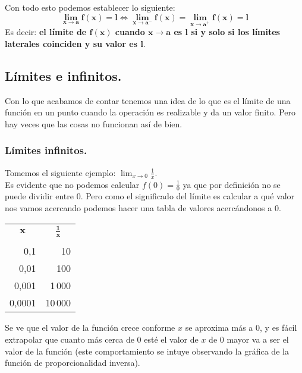 \documentclass[a4paper,11pt,answers]{exam}
\begin{document}
Con todo esto podemos establecer lo siguiente:
\[\boldsymbol{\lim_{x \to a} f(x) = l \Leftrightarrow \lim_{x \to a^-} f(x) = \lim_{x \to a^+} f(x) = l}\]
Es decir: \textbf{el límite de $\boldsymbol{f(x)}$ cuando $\boldsymbol{x \to a}$ es $\boldsymbol{l}$ si y solo si los límites laterales coinciden y su valor es $\boldsymbol{l}$}.

\subsection{Límites e infinitos.}
Con lo que acabamos de contar tenemos una idea de lo que es el límite de una función en un punto cuando la operación es realizable y da un valor finito. Pero hay veces que las cosas no funcionan así de bien.\\

\subsubsection{Límites infinitos.}
Tomemos el siguiente ejemplo: $\lim_{x \to 0} \frac{1}{x}$.\\
Es evidente que no podemos calcular $f(0) = \frac{1}{0}$ ya que por definición no se puede dividir entre 0. Pero como el significado del límite es calcular a qué valor nos vamos acercando podemos hacer una tabla de valores acercándonos a 0.
\begin{center}
\begin{tabular}{r|r}
\multicolumn{1}{c|}{$\boldsymbol{x}$} & \multicolumn{1}{c}{$\boldsymbol{\frac{1}{x}}$} \\ 
&\\
\hline
0,1&10\\
0,01&100\\
0,001&1\,000\\
0,0001&10\,000
\end{tabular}
\end{center}
Se ve que el valor de la función crece conforme $x$ se aproxima más a 0, y es fácil extrapolar que cuanto más cerca de 0 esté el valor de $x$ de 0 mayor va a ser el valor de la función (este comportamiento se intuye observando la gráfica de la función de proporcionalidad inversa).\\
\end{document}
